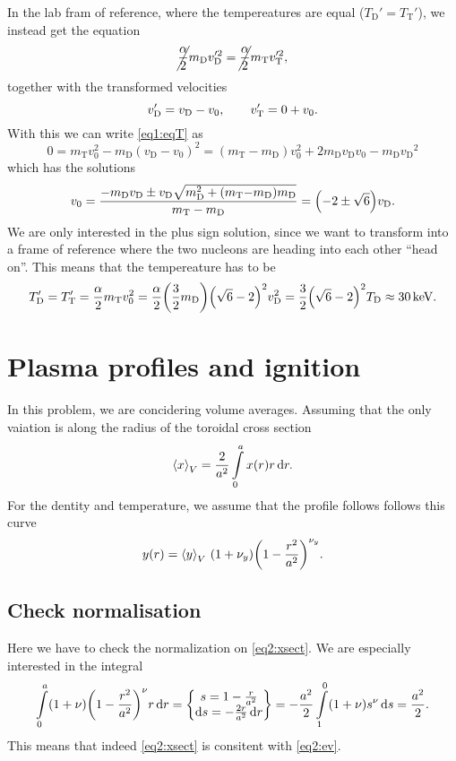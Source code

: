 \documentclass[11pt,a4paper, 
swedish, english %
]{article}
\newcommand{\mH}{\ensuremath{m_{\text{H}}}}
\newcommand{\vD}{\ensuremath{v_{\text{D}}}}
\newcommand{\TD}{\ensuremath{T_{\text{D}}}}
\newcommand{\mD}{\ensuremath{m_{\text{D}}}}
\newcommand{\vT}{\ensuremath{v_{\text{T}}}}
\newcommand{\TT}{\ensuremath{T_{\text{T}}}}
\newcommand{\mT}{\ensuremath{m_{\text{T}}}}
\begin{document}
In the lab fram of reference, where the tempereatures are equal
($\TD'=\TT'$), we instead get the equation
\begin{equation}\label{eq1:eqT}
\cancel{\frac{\alpha}{2}}\mD\vD'^2=\cancel{\frac{\alpha}{2}}\mT\vT'^2,
\end{equation}
together with the transformed velocities
\begin{equation}
\vD'=\vD-v_0\qc\quad\vT'=0+v_0.
\end{equation}
With this we can write \eqref{eq1:eqT} as
\begin{equation}
0=\mT v_0^2-\mD(\vD-v_0)^2
=(\mT-\mD)v_0^2 +2\mD\vD v_0 - \mD\vD^2
\end{equation}
which has the solutions
\begin{equation}
v_0=\frac{-\mD\vD\pm
\vD\sqrt{\mD^2+(\mT{-}\mD)\mD}
}{\mT-\mD}
=\qty(-2\pm\sqrt{6})\vD.
\end{equation}
We are only interested in the plus sign solution, since we want to
transform into a frame of reference where the two nucleons are heading
into each other ``head on''. This means that the tempereature has to
be
\begin{equation}
\TD'=\TT'=\frac{\alpha}{2}\mT v_0^2
=\frac{\alpha}{2}\qty(\frac{3}{2}\mD)\qty(\sqrt6-2)^2\vD^2
=\frac{3}{2}\qty(\sqrt6-2)^2 \TD
\approx\unit[30]{keV}.
\end{equation}






\section{Plasma profiles and ignition}
In this problem, we are concidering volume averages. Assuming that
the only vaiation is along the radius of the toroidal cross section
\begin{equation}\label{eq2:ev}
\ev{x}_V=\frac{2}{a^2}\int_0^a x(r)r\id{r}.
\end{equation}
For the dentity and temperature, we assume that the profile follows
follows this curve
\begin{equation}\label{eq2:xsect}
y(r)=\ev{y}_V\, (1+\nu_y)\qty(1-\frac{r^2}{a^2})^{\nu_y}.
\end{equation}

\subsection{Check normalisation}
Here we have to check the normalization on \eqref{eq2:xsect}. We are
especially interested in the integral
\begin{equation}\label{eq2:norm}
\int_0^a(1+\nu)\qty(1-\frac{r^2}{a^2})^{\nu}r\id{r}=
\begin{Bmatrix}
  s=1-\frac{r}{a^2}\\
  \rd{s}=-\frac{2r}{a^2}\id{r}
\end{Bmatrix}
=-\frac{a^2}{2} \int_1^0(1+\nu)s^{\nu}\id{s}
=\frac{a^2}{2}.
\end{equation}
This means that indeed \eqref{eq2:xsect} is consitent with \eqref{eq2:ev}.
\end{document}
